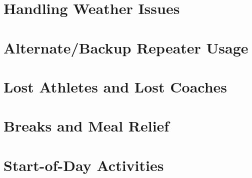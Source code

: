 \documentclass[pdflatex,letterpaper,twoside,12pt]{book}
\begin{document}

\section{Handling Weather Issues}

\iffalse %
 * Clearly define process or criteria in which we begin collecting or
   disseminating weather data? 
\fi %


\section{Alternate/Backup Repeater Usage}


\section{Lost Athletes and Lost Coaches}


\section{Breaks and Meal Relief}

\iffalse %
Director will now be responsible for getting meals to the net control folks, 
this worked perfect this time!
\fi %


\section{Start-of-Day Activities}

\iffalse %
 * Need notice for security to charge radios at night
     o Send a reminder voice communication Friday and Saturday Evenings
       (Logistics Control) 
\fi %
\end{document}
